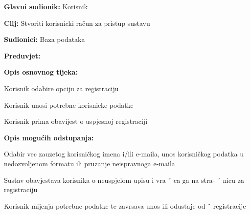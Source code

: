 					\noindent {}
					\begin{packed_item}

						\item \textbf{Glavni sudionik: }Korisnik
						\item  \textbf{Cilj:} Stvoriti korisnicki račun za pristup sustavu
						\item  \textbf{Sudionici:} Baza podataka
						\item  \textbf{Preduvjet:} 
						\item  \textbf{Opis osnovnog tijeka:}

						\item[] \begin{packed_enum}

							\item Korisnik odabire opciju za registraciju
							\item Korisnik unosi potrebne korisnicke podatke
							\item Korisnik prima obavijest o uspjesnoj registraciji 

						\end{packed_enum}

						\item  \textbf{Opis mogućih odstupanja:}

						\item[] \begin{packed_item}

							\item[2.a] Odabir vec zauzetog korisničkog imena i/ili e-maila, unos korisničkog podatka u nedozvoljenom formatu ili pruzanje neispravnoga e-maila 
							\item[] \begin{packed_enum}

								\item Sustav obavjestava korisnika o neuspjelom upisu i vra ˇ ca ga na stra- ´
								nicu za registraciju
								\item Korisnik mijenja potrebne podatke te zavrsava unos ili odustaje od ˇ
								registracije

							\end{packed_enum}
						\end{packed_item}
					\end{packed_item}

